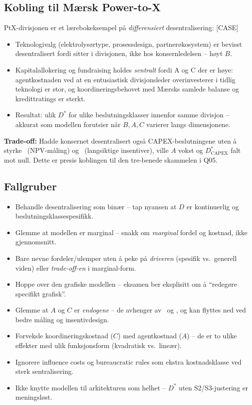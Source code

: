 \subsection*{Kobling til Mærsk Power-to-X}
PtX-divisjonen er et lærebokeksempel på \emph{differensiert} desentralisering: [CASE]
\begin{itemize}\setlength{\itemsep}{2pt}
\item Teknologivalg (elektrolysørtype, prosessdesign, partnerøkosystem) er bevisst desentralisert fordi  sitter i divisjonen, ikke hos konsernledelsen -- høyt $B$.
\item Kapitalallokering og fundraising holdes \emph{sentralt} fordi A og C der er høye: agentkostnaden ved at en entusiastisk divisjonsleder overinvesterer i tidlig teknologi er stor, og koordineringsbehovet med Mærsks samlede balanse og kredittratings er sterkt.
\item Resultat: ulik $D^{*}$ for ulike beslutningsklasser innenfor samme divisjon -- akkurat som modellen forutsier når $B, A, C$ varierer langs dimensjonene.
\end{itemize}
\textbf{Trade-off:} Hadde konsernet desentralisert også CAPEX-beslutningene uten å styrke \STwo\ (NPV-måling) og \SThree\ (langsiktige insentiver), ville $A$ vokst og $D^{*}_{\text{CAPEX}}$ falt mot null. Dette er presis koblingen til den tre-benede skammelen i Q05.

\subsection*{Fallgruber}
\begin{itemize}\setlength{\itemsep}{2pt}
\item Behandle desentralisering som binær -- tap nyansen at $D$ er kontinuerlig og beslutningsklassespesifikk.
\item Glemme at modellen er marginal -- snakk om \emph{marginal} fordel og kostnad, ikke gjennomsnitt.
\item Bare nevne fordeler/ulemper uten å peke på \emph{driveren} (spesifik vs.\ generell viden) eller \emph{trade-off-en} i marginal-form.
\item Hoppe over den grafiske modellen -- eksamen ber eksplisitt om å ``redegøre specifikt grafisk''.
\item Glemme at $A$ og $C$ er \emph{endogene} -- de avhenger av \STwo\ og \SThree, og kan flyttes ned ved bedre måling og insentivdesign.
\item Forveksle koordineringskostnad ($C$) med agentkostnad ($A$) -- de er to ulike effekter med ulik funksjonsform (kvadratisk vs.\ lineær).
\item Ignorere influence costs og bureaucratic rules som ekstra kostnadsklasse ved sterk sentralisering.
\item Ikke knytte modellen til arkitekturen som helhet -- $D^{*}$ uten S2/S3-justering er meningsløst.
\end{itemize}

